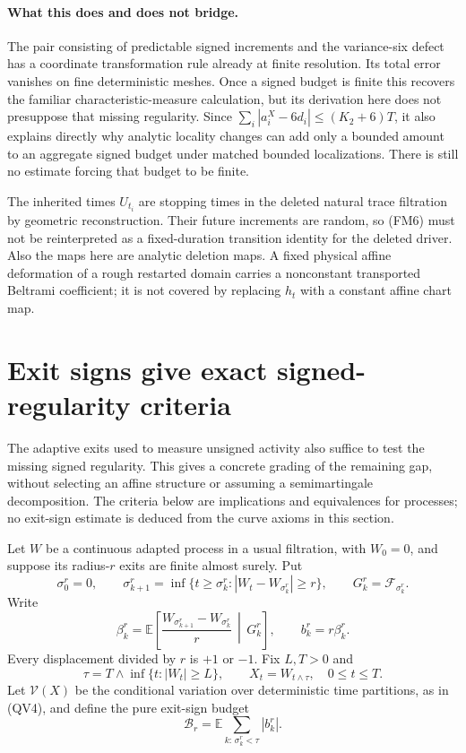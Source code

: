 \documentclass[11pt]{article}
\theoremstyle{definition}\newtheorem{definition}[theorem]{Definition}
\theoremstyle{remark}\newtheorem{remark}[theorem]{Remark}
\begin{document}
\paragraph{What this does and does not bridge.}
The pair consisting of predictable signed increments and the
variance-six defect has a coordinate transformation rule already at
finite resolution. Its total error vanishes on fine deterministic
meshes. Once a signed budget is finite this recovers the familiar
characteristic-measure calculation, but its derivation here does not
presuppose that missing regularity. Since
$\sum_i|a_i^X-6d_i|\le(K_2+6)T$, it also explains directly why
analytic locality changes can add only a bounded amount to an
aggregate signed budget under matched bounded localizations.
There is still no estimate forcing that budget to be finite.

The inherited times $U_{t_i}$ are stopping times in the deleted
natural trace filtration by geometric reconstruction. Their future
increments are random, so (FM6) must not be reinterpreted as a
fixed-duration transition identity for the deleted driver. Also the
maps here are analytic deletion maps. A fixed physical affine
deformation of a rough restarted domain carries a nonconstant
transported Beltrami coefficient; it is not covered by replacing
$h_t$ with a constant affine chart map.


\section{Exit signs give exact signed-regularity criteria}
\label{sec:exit-signed-bridge}

The adaptive exits used to measure unsigned activity also suffice to test
the missing signed regularity.  This gives a concrete grading of the
remaining gap, without selecting an affine structure or assuming a
semimartingale decomposition.  The criteria below are implications and
equivalences for processes; no exit-sign estimate is deduced from the
curve axioms in this section.

Let $W$ be a continuous adapted process in a usual filtration, with
$W_0=0$, and suppose its radius-$r$ exits are finite almost surely. Put
\[
 \sigma^r_0=0,\qquad
 \sigma^r_{k+1}=\inf\{t\ge\sigma^r_k:
              |W_t-W_{\sigma^r_k}|\ge r\},\qquad
 G^r_k=\mathcal F_{\sigma^r_k}.
\]
Write
\[
 \beta^r_k=\mathbb E\left[
       \frac{W_{\sigma^r_{k+1}}-W_{\sigma^r_k}}r
                    \,\middle|\,G^r_k\right],\qquad
 b^r_k=r\beta^r_k.
 \tag{EX1}
\]
Every displacement divided by $r$ is $+1$ or $-1$. Fix $L,T>0$ and
\[
 \tau=T\wedge\inf\{t:|W_t|\ge L\},\qquad X_t=W_{t\wedge\tau},
       \quad 0\le t\le T.
\]
Let $\mathcal V(X)$ be the conditional variation over deterministic time
partitions, as in (QV4), and define the pure exit-sign budget
\[
 \mathcal B_r=\mathbb E\sum_{k:\,\sigma^r_k<\tau}|b^r_k|.
 \tag{EX2}
\]
\end{document}
